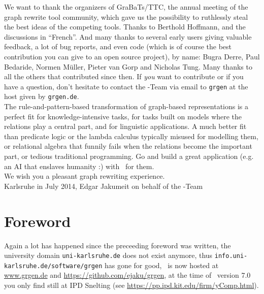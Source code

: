 
We want to thank the organizers of GraBaTs\cite{grabats}/TTC, the annual meeting of the graph rewrite tool community,
which gave us the possibility to ruthlessly steal the best ideas of the competing tools.
Thanks to Berthold Hoffmann, and the discussions in ``French''.
And many thanks to several early users giving valuable feedback, a lot of bug reports, and even code (which is of course the best contribution you can give to an open source project), by name:
Bugra Derre, Paul Bedaride, Normen Müller, Pieter van Gorp and Nicholas Tung.
Many thanks to all the others that contributed since then.
If \emph{you} want to contribute or if you have a question, don't hesitate to contact the \GrG-Team
via email to \texttt{grgen} at the host given by \texttt{grgen.de}.\\[2ex]

The rule-and-pattern-based transformation of graph-based representations is a perfect fit for know\-ledge-intensive tasks, for tasks built on models where the relations play a central part, and for linguistic applications.
A much better fit than predicate logic or the lambda calculus typically misused for modelling them, or relational algebra that funnily fails when the relations become the important part, or tedious traditional programming.
Go and build a great application (e.g. an AI that enslaves humanity :) with \GrG\ for them.\\[2ex]

We wish you a pleasant graph rewriting experience.\\[2ex]

\noindent Karlsruhe in July 2014, Edgar Jakumeit on behalf of the \GrG-Team

\pagebreak

\chapter*{Foreword}

Again a lot has happened since the preceeding foreword was written, the university domain \texttt{uni-karlsruhe.de} does not exist anymore, thus \texttt{info.uni-karlsruhe.de/software/grgen} has gone for good, \GrG\ is now hosted at \url{www.grgen.de} and \url{https://github.com/ejaku/grgen}, at the time of \GrG\ version 7.0 you only find \yComp{} still at IPD Snelting (see \url{https://pp.ipd.kit.edu/firm/yComp.html}).\\[2ex]

